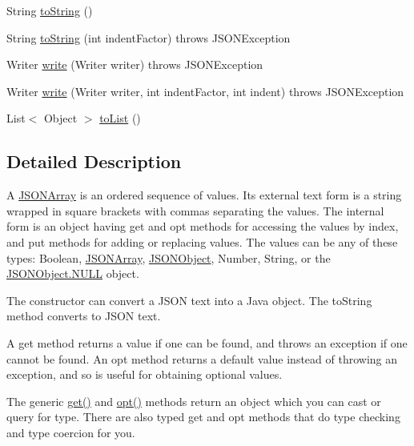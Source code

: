 \begin{DoxyCompactItemize}
\item 
String \hyperlink{classorg_1_1json_1_1JSONArray_afc869e72ec78bf906683ab2f77cdba77}{to\-String} ()
\item 
String \hyperlink{classorg_1_1json_1_1JSONArray_a4f18bcd5cb7b9f2b7c7918c55e0e9b10}{to\-String} (int indent\-Factor)  throws J\-S\-O\-N\-Exception 
\item 
Writer \hyperlink{classorg_1_1json_1_1JSONArray_a28e509c7d8e5606e10a7a321c167aec8}{write} (Writer writer)  throws J\-S\-O\-N\-Exception 
\item 
Writer \hyperlink{classorg_1_1json_1_1JSONArray_a1014b777a9b43800254b256354f79183}{write} (Writer writer, int indent\-Factor, int indent)  throws J\-S\-O\-N\-Exception 
\item 
List$<$ Object $>$ \hyperlink{classorg_1_1json_1_1JSONArray_a331bb92aabf63f192755b85e8f86b25b}{to\-List} ()
\end{DoxyCompactItemize}


\subsection{Detailed Description}
A \hyperlink{classorg_1_1json_1_1JSONArray}{J\-S\-O\-N\-Array} is an ordered sequence of values. Its external text form is a string wrapped in square brackets with commas separating the values. The internal form is an object having {\ttfamily get} and {\ttfamily opt} methods for accessing the values by index, and {\ttfamily put} methods for adding or replacing values. The values can be any of these types\-: {\ttfamily Boolean}, {\ttfamily \hyperlink{classorg_1_1json_1_1JSONArray}{J\-S\-O\-N\-Array}}, {\ttfamily \hyperlink{classorg_1_1json_1_1JSONObject}{J\-S\-O\-N\-Object}}, {\ttfamily Number}, {\ttfamily String}, or the {\ttfamily \hyperlink{classorg_1_1json_1_1JSONObject_a01c74a31a1abfd34ab13beb9347855ac}{J\-S\-O\-N\-Object.\-N\-U\-L\-L} object}. 

The constructor can convert a J\-S\-O\-N text into a Java object. The {\ttfamily to\-String} method converts to J\-S\-O\-N text. 

A {\ttfamily get} method returns a value if one can be found, and throws an exception if one cannot be found. An {\ttfamily opt} method returns a default value instead of throwing an exception, and so is useful for obtaining optional values. 

The generic {\ttfamily \hyperlink{classorg_1_1json_1_1JSONArray_a3a8413753f53e0c0a5e008816c915eae}{get()}} and {\ttfamily \hyperlink{classorg_1_1json_1_1JSONArray_a19aa83c80cded3d0a252c212ceca7954}{opt()}} methods return an object which you can cast or query for type. There are also typed {\ttfamily get} and {\ttfamily opt} methods that do type checking and type coercion for you. 

